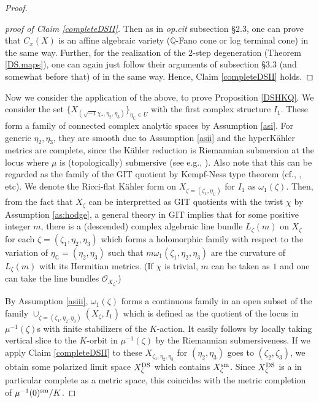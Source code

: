 \documentclass[12pt,a4paper]{amsart}
\theoremstyle{remark}
\theoremstyle{definition}
\def\C{\mathbb{C}}
\def\Q{\mathbb{Q}}
\begin{document}
\begin{proof}
\begin{proof}[proof of Claim \ref{completeDSII}]
Then as in {\it op.cit} subsection \S 2.3, one can prove that 
$C_x(X)$
is an affine algebraic variety ($\Q$-Fano cone or log terminal cone) 
in the same way. 
Further, for the realization of the 2-step degeneration (Theorem 
\ref{DS.maps}), 
one can again just follow their arguments of subsection 
\S 3.3 (and somewhat before that) of \cite{DSII} in the same way. Hence, Claim \ref{completeDSII} holds.     
\end{proof}

Now we consider the application of the above, to prove 
Proposition \ref{DSHKQ}. We consider the set 
$\{X_{(\sqrt{-1}\chi_*,\eta_2,\eta_3)}\}_{\eta_\C\in U}$ 
with the first complex structure $I_1$. 
These form a family of connected complex analytic spaces 
by Assumption \ref{asi}. 
For generic $\eta_2,\eta_3$, 
they are smooth due to Assumption \ref{asii} and the 
hyperK\"ahler metrics are complete, 
since the K\"ahler reduction is 
Riemannian submersion at the locus where $\mu$ is (topologically) 
submersive 
(see e.g., \cite[\S 3 A, C, D]{HKLR}). 
Also note that 
this can be regarded as the family of the GIT 
quotient by Kempf-Ness type theorem (cf., \cite[1.4(i)]{May}, \cite[9.66]{Kir} etc). 
We denote the Ricci-flat K\"ahler form on $X_{\zeta=(\zeta_1,\eta_\C)}$ 
for $I_1$ as 
$\omega_{1}(\zeta)$. Then, from the fact that $X_\zeta$ can be interpretted 
as GIT quotients with the twist $\chi$ by Assumption \ref{as:hodge}, 
a general theory in GIT implies 
that for some positive integer $m$, there is a (descended) 
complex algebraic 
line bundle $L_{\zeta}(m)$ on $X_\zeta$ for each 
$\zeta=(\zeta_1,\eta_2,\eta_3)$ 
which forms a holomorphic family 
with respect to the variation of $\eta_\C=(\eta_2,\eta_3)$ 
such that $m\omega_{1}(\zeta_1,\eta_2,\eta_3)$ 
are the curvature of $L_{\zeta}(m)$ with its Hermitian metrics. 
(If $\chi$ is trivial, $m$ can be taken as $1$ and one can take 
the line bundles $\mathcal{O}_{X_\zeta}$.) 

By Assumption \ref{asiii}, 
$\omega_1(\zeta)$ forms a continuous family 
in an open subset of the family 
$\cup_{\zeta=(\zeta_1,\eta_2,\eta_3)}(X_\zeta,I_1)$ which is defined as the quotient of 
the locus in $\mu^{-1}(\zeta)$s 
with finite stabilizers of the $K$-action. 
It easily follows by locally 
taking vertical slice to the $K$-orbit in $\mu^{-1}(\zeta)$ 
by the Riemannian submersiveness. 
If we apply Claim \ref{completeDSII} to these 
$X_{\zeta_1,\eta_2,\eta_3}$ 
for $(\eta_2, \eta_3)$ goes to $(\zeta_2, \zeta_3)$, 
we obtain some 
polarized limit space $X_\zeta^{\rm DS}$ which contains $X_\zeta^{\rm sm}$. 
Since $X_\zeta^{\rm DS}$ is a in particular complete as a metric space, this coincides with 
the metric completion of $\mu^{-1}(0)^{\rm sm}/K$. 


\end{proof}
\end{document}

